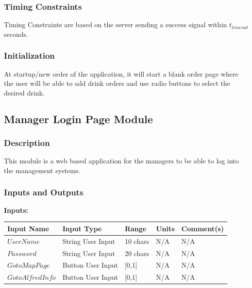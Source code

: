 \documentclass [10pt]{article}
\begin{document}

\subsubsection{Timing Constraints}
Timing Constraints are based on the server sending a success signal within $ t_{timeout} $ seconds.


\subsubsection{Initialization}
At startup/new order of the application, it will start a blank order page where the user will be able to add drink orders and use radio buttons to select the desired drink.


\subsection{Manager Login Page Module}


\subsubsection{Description}
This module is a web based application for the managers to be able to log into the management systems.


\subsubsection{Inputs and Outputs}

\textbf{Inputs: } \newline

\begin{longtable}{|l|l|l|l|l|}\hline 
	\rowcolor{tableCell}\textbf{Input Name} & \textbf{Input Type} & \textbf{Range} & \textbf{Units} & \textbf{Comment(s)} \\ \hline
	$  UserName $ & String User Input & 10 chars & N/A & N/A\\ \hline
	\rowcolor{tableCell}$  Password $ & String User Input & 20 chars  & N/A & N/A\\ \hline
	$  GotoMapPage $ & Button User Input & [0,1]  & N/A & N/A\\ \hline
	\rowcolor{tableCell}$  GotoAlfredInfo $ & Button User Input & [0,1]  & N/A & N/A\\ \hline
\end{longtable}
\end{document}
